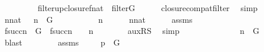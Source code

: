 \begin{isabellebody}
\ \ \isamarkupfalse%
\ \ \isanewline
\ \ \isamarkupfalse%
\ {\isachardoublequoteopen}filter{\isacharparenleft}{\kern0pt}upclosure{\isacharparenleft}{\kern0pt}f{\isacharbackquote}{\kern0pt}{\isacharbackquote}{\kern0pt}nat{\isacharparenright}{\kern0pt}{\isacharparenright}{\kern0pt}{\isachardoublequoteclose}\ {\isacharparenleft}{\kern0pt}\ {\isachardoublequoteopen}filter{\isacharparenleft}{\kern0pt}{\isacharquery}{\kern0pt}G{\isacharparenright}{\kern0pt}{\isachardoublequoteclose}{\isacharparenright}{\kern0pt}\isanewline
\ \ \ \ \isamarkupfalse%
\ closure{\isacharunderscore}{\kern0pt}compat{\isacharunderscore}{\kern0pt}filter\ \isamarkupfalse%
\ simp\isanewline
\ \ \isamarkupfalse%
\isanewline
\ \ \isamarkupfalse%
\ {\isachardoublequoteopen}{\isasymforall}n{\isasymin}nat{\isachardot}{\kern0pt}\ {\isasymD}\ {\isacharbackquote}{\kern0pt}\ n\ {\isasyminter}\ {\isacharquery}{\kern0pt}G\ {\isasymnoteq}\ {}{\isachardoublequoteclose}\isanewline
\ \ \isamarkupfalse%
\isanewline
\ \ \ \ \isamarkupfalse%
\ n\isanewline
\ \ \ \ \isamarkupfalse%
\ {\isachardoublequoteopen}n{\isasymin}nat{\isachardoublequoteclose}\isanewline
\ \ \ \ \isamarkupfalse%
\ assms\ \isanewline
\ \ \ \ \isamarkupfalse%
\ {\isachardoublequoteopen}f{\isacharbackquote}{\kern0pt}succ{\isacharparenleft}{\kern0pt}n{\isacharparenright}{\kern0pt}\ {\isasymin}\ {\isacharquery}{\kern0pt}G\ {\isasymand}\ f{\isacharbackquote}{\kern0pt}succ{\isacharparenleft}{\kern0pt}n{\isacharparenright}{\kern0pt}\ {\isasymin}\ {\isasymD}\ {\isacharbackquote}{\kern0pt}\ n{\isachardoublequoteclose}\isanewline
\ \ \ \ \ \ \isamarkupfalse%
\ aux{\isacharunderscore}{\kern0pt}RS{}\ \isamarkupfalse%
\ simp\isanewline
\ \ \ \ \isamarkupfalse%
\ \isanewline
\ \ \ \ \isamarkupfalse%
\ {\isachardoublequoteopen}{\isasymD}\ {\isacharbackquote}{\kern0pt}\ n\ {\isasyminter}\ {\isacharquery}{\kern0pt}G\ {\isasymnoteq}\ {}{\isachardoublequoteclose}\ \ \isamarkupfalse%
\ blast\isanewline
\ \ \isamarkupfalse%
\isanewline
\ \ \isamarkupfalse%
\ \isamarkupfalse%
\ assms\ \isanewline
\ \ \isamarkupfalse%
\ {\isachardoublequoteopen}p\ {\isasymin}\ {\isacharquery}{\kern0pt}G{\isachardoublequoteclose}\isanewline
\ \ \ \ \isamarkupfalse%

\end{isabellebody}
